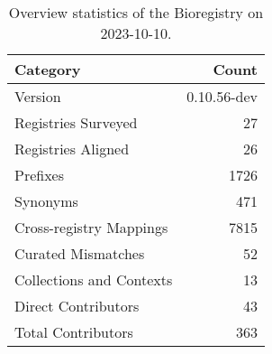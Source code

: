 \begin{table}
\caption{Overview statistics of the Bioregistry on 2023-10-10.}
\label{tab:bioregistry-summary}
\begin{tabular}{lr}
\toprule
Category & Count \\
\midrule
Version & 0.10.56-dev \\
Registries Surveyed & 27 \\
Registries Aligned & 26 \\
Prefixes & 1726 \\
Synonyms & 471 \\
Cross-registry Mappings & 7815 \\
Curated Mismatches & 52 \\
Collections and Contexts & 13 \\
Direct Contributors & 43 \\
Total Contributors & 363 \\
\bottomrule
\end{tabular}
\end{table}
